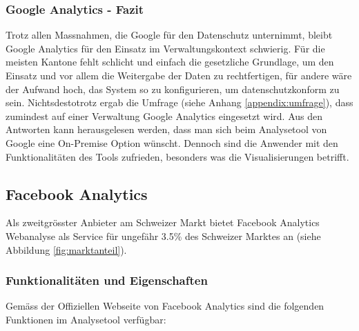\subsubsection{Google Analytics - Fazit}
Trotz allen Massnahmen, die Google für den Datenschutz unternimmt, bleibt Google Analytics für den Einsatz im Verwaltungskontext schwierig. Für die meisten Kantone fehlt schlicht und einfach die gesetzliche Grundlage, um den Einsatz und vor allem die Weitergabe der Daten zu rechtfertigen, für andere wäre der Aufwand hoch, das System so zu konfigurieren, um datenschutzkonform zu sein. Nichtsdestotrotz ergab die Umfrage (siehe Anhang \ref{appendix:umfrage}), dass zumindest auf einer Verwaltung Google Analytics eingesetzt wird. Aus den Antworten kann herausgelesen werden, dass man sich beim Analysetool von Google eine On-Premise Option wünscht. Dennoch sind die Anwender mit den Funktionalitäten des Tools zufrieden, besonders was die Visualisierungen betrifft.

\newpage

\subsection{Facebook Analytics} \label{subsec:FacebookAnalytics}

Als zweitgrösster Anbieter am Schweizer Markt bietet Facebook Analytics Webanalyse als Service für ungefähr 3.5\% des Schweizer Marktes an (siehe Abbildung \ref{fig:marktanteil}).

\subsubsection{Funktionalitäten und Eigenschaften}
Gemäss der Offiziellen Webseite von Facebook Analytics sind die folgenden Funktionen im Analysetool verfügbar:

